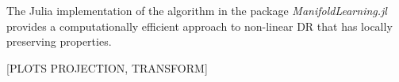 %



The Julia implementation of the algorithm in the package \textit{ManifoldLearning.jl} provides a computationally efficient approach to non-linear DR that has locally preserving properties.

[PLOTS PROJECTION, TRANSFORM]






